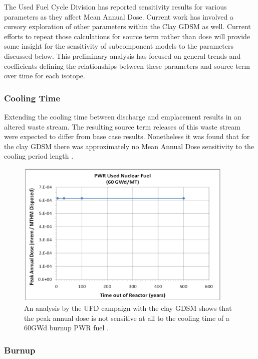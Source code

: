 The Used Fuel Cycle Division has reported sensitivity results for various 
parameters as they affect Mean Annual Dose. Current work has involved a cursory  
exploration of other parameters within the Clay \gls{GDSM} as well. Current 
efforts to repeat those calculations for source term rather than 
dose will provide some insight for the sensitivity of subcomponent models to the 
parameters discussed below. This preliminary analysis has focused on general 
trends and coefficients defining the relationships between these 
parameters and source term over time for each isotope. 

\subsubsection{Cooling Time}

Extending the cooling time between discharge and emplacement results
in an altered waste stream. The resulting source term releases
of this waste stream were expected to differ from base case results. 
Nonetheless it was found that for the clay \gls{GDSM} there was approximately 
no Mean Annual Dose sensitivity to the cooling period length 
\cite{clayton_generic_2011}.

\begin{figure}[h!]
  \begin{center}
    \includegraphics[height=7cm]{./chapters/current/coolingTime.eps}
  \end{center}
  \caption{An analysis by the UFD campaign with the clay GDSM shows that
  the peak annual dose is not sensitive at all to the cooling time of a 60GWd 
  burnup PWR fuel \cite{clayton_generic_2011}.}
  \label{fig:coolingTime}
\end{figure}

\clearpage 

\subsubsection{Burnup}

